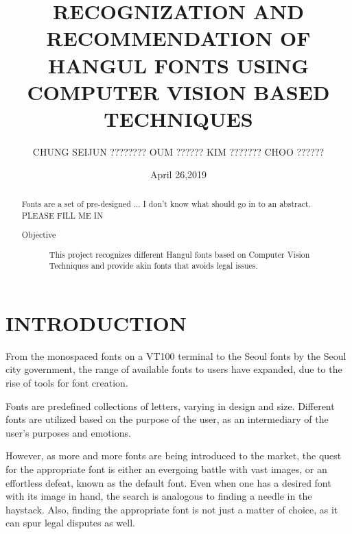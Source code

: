 \documentclass[%
 reprint,
nofootinbib,
nobibnotes,
amsmath,amssymb,
aps,
]{revtex4-1}
\begin{document}

\title{RECOGNIZATION AND RECOMMENDATION OF HANGUL FONTS USING COMPUTER VISION BASED
TECHNIQUES}%

\author{CHUNG SEIJUN ???????? OUM ?????? KIM  ??????? CHOO ??????   }
%
\date{April 26,2019}

\begin{abstract}
  Fonts are a set of pre-designed ... I don't know what should go in to an
  abstract. PLEASE FILL ME IN
\begin{description}
\item[Objective]
This project recognizes different Hangul fonts based on Computer Vision
    Techniques and provide akin fonts that avoids legal issues.
\end{description}
\end{abstract}

\maketitle


\section{\label{sec:level1}INTRODUCTION}
From the monospaced fonts on a VT100 terminal to the
Seoul fonts by the Seoul city government, the range of available fonts to users have expanded, due to the rise of tools for font creation.

Fonts are predefined collections of letters, varying in design and size.
Different fonts are utilized based on the purpose of the user, as an
intermediary of the user's purposes and emotions.

However, as more and more fonts are being introduced to the market, the quest
for the appropriate font is either an evergoing battle with vast images,
or an effortless defeat, known as the default font. Even when one has a
desired font with its image in hand, the search is analogous to finding a needle in the
haystack. Also, finding the appropriate font is not just a matter of choice, as it can spur legal
disputes as well.\cite{lawsuit}
\end{document}
